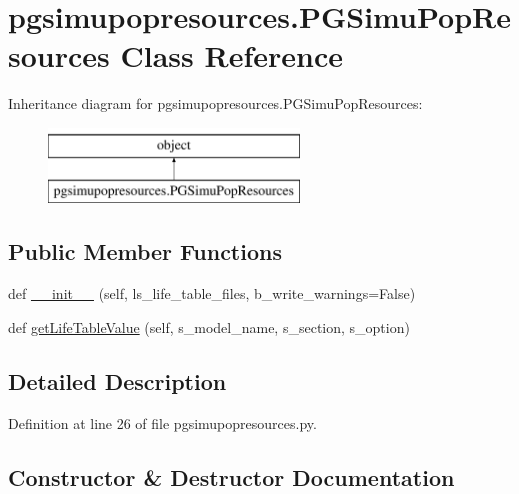 \hypertarget{classpgsimupopresources_1_1PGSimuPopResources}{}\section{pgsimupopresources.\+P\+G\+Simu\+Pop\+Resources Class Reference}
\label{classpgsimupopresources_1_1PGSimuPopResources}
Inheritance diagram for pgsimupopresources.\+P\+G\+Simu\+Pop\+Resources\+:\begin{figure}[H]
\begin{center}
\leavevmode
\includegraphics[height=2.000000cm]{classpgsimupopresources_1_1PGSimuPopResources}
\end{center}
\end{figure}
\subsection*{Public Member Functions}
\begin{DoxyCompactItemize}
\item 
def \hyperlink{classpgsimupopresources_1_1PGSimuPopResources_a74bd1c4974b23f6d8ed44a14568714ff}{\+\_\+\+\_\+init\+\_\+\+\_\+} (self, ls\+\_\+life\+\_\+table\+\_\+files, b\+\_\+write\+\_\+warnings=False)
\item 
def \hyperlink{classpgsimupopresources_1_1PGSimuPopResources_ace3ec1ee66c54bfb806a7dfa80755105}{get\+Life\+Table\+Value} (self, s\+\_\+model\+\_\+name, s\+\_\+section, s\+\_\+option)
\end{DoxyCompactItemize}


\subsection{Detailed Description}
\begin{DoxyVerb}\end{DoxyVerb}
 

Definition at line 26 of file pgsimupopresources.\+py.



\subsection{Constructor \& Destructor Documentation}
